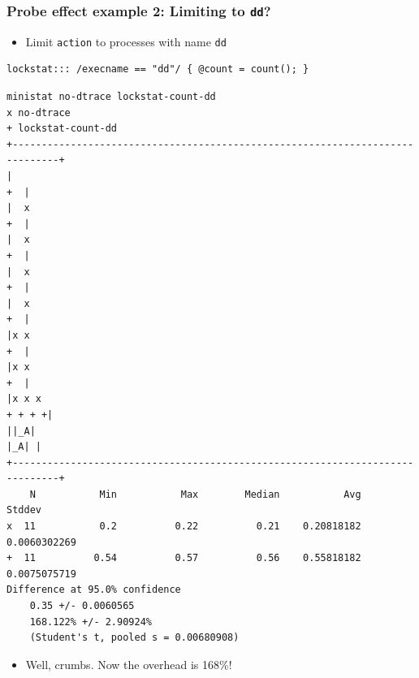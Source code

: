 \begin{frame}[fragile]
  \frametitle{Probe effect example 2: Limiting to \texttt{dd}?}

  \begin{itemize}
    \item Limit \texttt{action} to processes with name \texttt{dd}
  \end{itemize}

  \begin{small}
    \begin{verbatim}
lockstat::: /execname == "dd"/ { @count = count(); }
\end{verbatim}
  \end{small}

  \pause

  \begin{center}
    \begin{tiny}
      \begin{verbatim}
ministat no-dtrace lockstat-count-dd 
x no-dtrace
+ lockstat-count-dd
+------------------------------------------------------------------------------+
|                                                                           +  |
|  x                                                                        +  |
|  x                                                                        +  |
|  x                                                                        +  |
|  x                                                                        +  |
|x x                                                                        +  |
|x x                                                                        +  |
|x x x                                                                  + + + +|
||_A|                                                                     |_A| |
+------------------------------------------------------------------------------+
    N           Min           Max        Median           Avg        Stddev
x  11           0.2          0.22          0.21    0.20818182  0.0060302269
+  11          0.54          0.57          0.56    0.55818182  0.0075075719
Difference at 95.0% confidence
	0.35 +/- 0.0060565
	168.122% +/- 2.90924%
	(Student's t, pooled s = 0.00680908)
\end{verbatim}
    \end{tiny}
  \end{center}

  \begin{itemize}
    \item Well, crumbs.  Now the overhead is 168\%!
  \end{itemize}
\end{frame}

